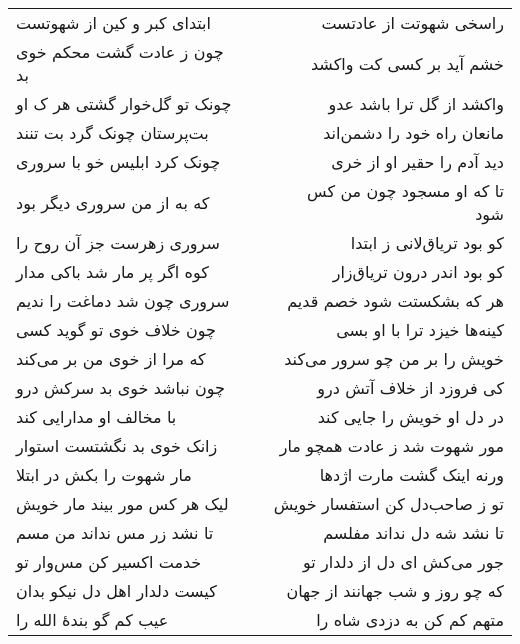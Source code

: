 \begin{center}
\begin{longtable}{l p{0.5cm} r}
ابتدای کبر و کین از شهوتست
&&
راسخی شهوتت از عادتست
\\
چون ز عادت گشت محکم خوی بد
&&
خشم آید بر کسی کت واکشد
\\
چونک تو گل‌خوار گشتی هر ک او
&&
واکشد از گل ترا باشد عدو
\\
بت‌پرستان چونک گرد بت تنند
&&
مانعان راه خود را دشمن‌اند
\\
چونک کرد ابلیس خو با سروری
&&
دید آدم را حقیر او از خری
\\
که به از من سروری دیگر بود
&&
تا که او مسجود چون من کس شود
\\
سروری زهرست جز آن روح را
&&
کو بود تریاق‌لانی ز ابتدا
\\
کوه اگر پر مار شد باکی مدار
&&
کو بود اندر درون تریاق‌زار
\\
سروری چون شد دماغت را ندیم
&&
هر که بشکستت شود خصم قدیم
\\
چون خلاف خوی تو گوید کسی
&&
کینه‌ها خیزد ترا با او بسی
\\
که مرا از خوی من بر می‌کند
&&
خویش را بر من چو سرور می‌کند
\\
چون نباشد خوی بد سرکش درو
&&
کی فروزد از خلاف آتش درو
\\
با مخالف او مدارایی کند
&&
در دل او خویش را جایی کند
\\
زانک خوی بد نگشتست استوار
&&
مور شهوت شد ز عادت همچو مار
\\
مار شهوت را بکش در ابتلا
&&
ورنه اینک گشت مارت اژدها
\\
لیک هر کس مور بیند مار خویش
&&
تو ز صاحب‌دل کن استفسار خویش
\\
تا نشد زر مس نداند من مسم
&&
تا نشد شه دل نداند مفلسم
\\
خدمت اکسیر کن مس‌وار تو
&&
جور می‌کش ای دل از دلدار تو
\\
کیست دلدار اهل دل نیکو بدان
&&
که چو روز و شب جهانند از جهان
\\
عیب کم گو بندهٔ الله را
&&
متهم کم کن به دزدی شاه را
\\
\end{longtable}
\end{center}
